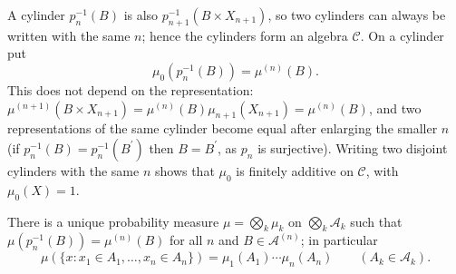 A cylinder $p_n^{-1}(B)$ is also $p_{n+1}^{-1}(B \times X_{n+1})$, so two cylinders can always be written with the same $n$; hence the cylinders form an algebra $\mathcal{C}$. On a cylinder put
\[
\mu_0(p_n^{-1}(B)) = \mu^{(n)}(B).
\]
This does not depend on the representation: $\mu^{(n+1)}(B \times X_{n+1}) = \mu^{(n)}(B)\mu_{n+1}(X_{n+1}) = \mu^{(n)}(B)$, and two representations of the same cylinder become equal after enlarging the
smaller $n$ (if $p_n^{-1}(B) = p_n^{-1}(B^{\prime})$ then $B = B^{\prime}$, as $p_n$ is surjective). Writing two disjoint cylinders with the same $n$ shows that $\mu_0$ is finitely additive on $\mathcal{C}$,
with $\mu_0(X) = 1$.

\begin{theorem}\label{measure-theory:theorem-infinite-product}
There is a unique probability measure $\mu = \bigotimes_k\mu_k$ on $\bigotimes_k\mathcal{A}_k$ such that $\mu(p_n^{-1}(B)) = \mu^{(n)}(B)$ for all $n$ and $B \in \mathcal{A}^{(n)}$; in particular
\[
\mu(\{x : x_1 \in A_1, \ldots, x_n \in A_n\}) = \mu_1(A_1) \cdots \mu_n(A_n) \qquad (A_k \in \mathcal{A}_k).
\]
\end{theorem}

